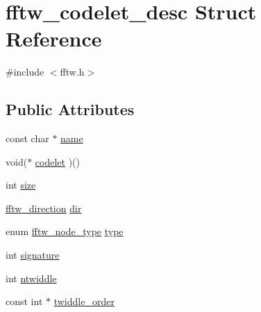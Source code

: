 \hypertarget{structfftw__codelet__desc}{\section{fftw\-\_\-codelet\-\_\-desc Struct Reference}
\label{structfftw__codelet__desc}
}


{\ttfamily \#include $<$fftw.\-h$>$}

\subsection*{Public Attributes}
\begin{DoxyCompactItemize}
\item 
const char $\ast$ \hyperlink{structfftw__codelet__desc_a2e0f3f98d154f213a77939edc509a42d}{name}
\item 
void($\ast$ \hyperlink{structfftw__codelet__desc_a1171a8defb587b1b946642b2be5b2424}{codelet} )()
\item 
int \hyperlink{structfftw__codelet__desc_a195e2487dcd74ffc44f888612d25ac94}{size}
\item 
\hyperlink{fftw_8h_addfba51b1dc43e3660873b1ba9668cec}{fftw\-\_\-direction} \hyperlink{structfftw__codelet__desc_aec7e3024bee1423a31c5a3e628154d1c}{dir}
\item 
enum \hyperlink{fftw_8h_a62ecac3f39269a2efca878ca819349f1}{fftw\-\_\-node\-\_\-type} \hyperlink{structfftw__codelet__desc_a70eb46f55828f3b899272641c9d76949}{type}
\item 
int \hyperlink{structfftw__codelet__desc_a8cf3f5020d8697ef1e29cc2d82be0dae}{signature}
\item 
int \hyperlink{structfftw__codelet__desc_a2e68bbd836d4b760a1cd75c66409fd36}{ntwiddle}
\item 
const int $\ast$ \hyperlink{structfftw__codelet__desc_a655dd809b3b9a6f6c0676879f08b05a1}{twiddle\-\_\-order}
\end{DoxyCompactItemize}


